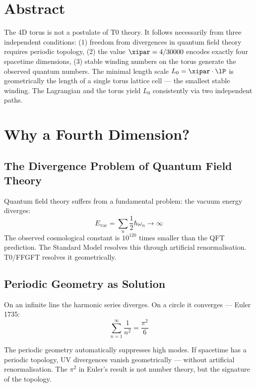 \section*{Abstract}

The 4D torus is not a postulate of T0 theory. It follows necessarily from three independent conditions: (1) freedom from divergences in quantum field theory requires periodic topology, (2) the value $\xipar = 4/30000$ encodes exactly four spacetime dimensions, (3) stable winding numbers on the torus generate the observed quantum numbers. The minimal length scale $L_0 = \xipar \cdot \lP$ is geometrically the length of a single torus lattice cell — the smallest stable winding. The Lagrangian and the torus yield $L_0$ consistently via two independent paths.

\section{Why a Fourth Dimension?}

\subsection{The Divergence Problem of Quantum Field Theory}

Quantum field theory suffers from a fundamental problem: the vacuum energy diverges:
\begin{equation}
	E_{\text{vac}} = \sum_n \frac{1}{2}\hbar\omega_n \rightarrow \infty
\end{equation}
The observed cosmological constant is $10^{120}$ times smaller than the QFT prediction. The Standard Model resolves this through artificial renormalisation. T0/FFGFT resolves it geometrically.

\subsection{Periodic Geometry as Solution}

On an infinite line the harmonic series diverges. On a circle it converges — Euler 1735:
\begin{equation}
	\sum_{n=1}^{\infty} \frac{1}{n^2} = \frac{\pi^2}{6}
\end{equation}

\begin{keypoint}
The periodic geometry automatically suppresses high modes. If spacetime has a periodic topology, UV divergences vanish geometrically — without artificial renormalisation. The $\pi^2$ in Euler's result is not number theory, but the signature of the topology.
\end{keypoint}

